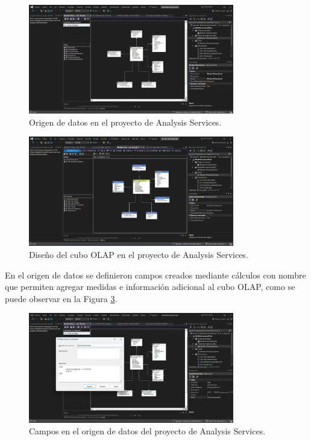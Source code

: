 \begin{figure}[H]
    \centering
    \includegraphics[width=0.8\textwidth]{chapters/III-resultados-y-discusion/resources/images/origen-datos-olap.png}
    \caption{Origen de datos en el proyecto de Analysis Services.}
    \label{fig:origen-datos-olap}
\end{figure}

\begin{figure}[H]
    \centering
    \includegraphics[width=0.8\textwidth]{chapters/III-resultados-y-discusion/resources/images/cubo-olap.png}
    \caption{Diseño del cubo OLAP en el proyecto de Analysis Services.}
    \label{fig:cubo-olap}
\end{figure}

En el origen de datos se definieron campos creados mediante cálculos con nombre que permiten agregar medidas e información
adicional al cubo OLAP, como se puede observar en la Figura \ref{fig:campos-origen-datos-olap}.

\begin{figure}[H]
    \centering
    \includegraphics[width=0.8\textwidth]{chapters/III-resultados-y-discusion/resources/images/campos-origen-datos-olap.png}
    \caption{Campos en el origen de datos del proyecto de Analysis Services.}
    \label{fig:campos-origen-datos-olap}
\end{figure}

